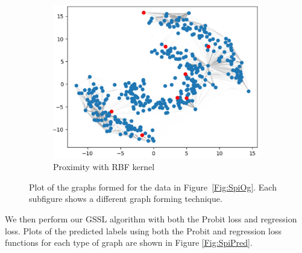 \documentclass[12pt]{amsart}
\begin{document}
\begin{figure}[ht]
\begin{subfigure}{0.475\linewidth}
    \includegraphics[width=0.8\linewidth]{Figures/SpiProx.png} 
    \caption{Proximity with RBF kernel} 
    \label{Fig:SpiProx}
  \end{subfigure} 
  \caption{Plot of the graphs formed for the data in Figure~\ref{Fig:SpiOg}. Each subfigure shows a different graph forming technique.}
  \label{Fig:SpiGraphs} 
\end{figure}
We then perform our GSSL algorithm with both the Probit loss and regression loss. Plots of the predicted labels using both the Probit and regression loss functions for each type of graph are shown in Figure \ref{Fig:SpiPred}.
\end{document}

